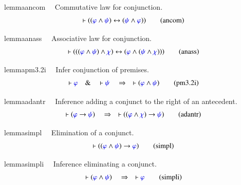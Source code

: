 \begin{restatable}{lemma}{ancom}~~ Commutative law for conjunction.  
\begin{align}
\vdash ( ( \mw{\varphi} \wedge \mw{\psi} ) \leftrightarrow ( \mw{\psi} \wedge
    \mw{\varphi} ) )\label{eq:ancom}\tag{ancom}
\end{align}
\end{restatable}

\begin{restatable}{lemma}{anass}~~ Associative law for conjunction.  
\begin{align}
\vdash ( ( ( \mw{\varphi} \wedge \mw{\psi} ) \wedge \mw{\chi} ) \leftrightarrow
    ( \mw{\varphi} \wedge ( \mw{\psi} \wedge \mw{\chi} ) )
    )\label{eq:anass}\tag{anass}
\end{align}
\end{restatable}

\begin{restatable}{lemma}{pm3.2i}~~ Infer conjunction of premises.  
\begin{align}
\vdash \mw{\varphi}\quad\&\quad \vdash \mw{\psi}\quad\Rightarrow\quad \vdash (
    \mw{\varphi} \wedge \mw{\psi} )\label{eq:pm3.2i}\tag{pm3.2i}
\end{align}
\end{restatable}

\begin{restatable}{lemma}{adantr}~~ Inference adding a conjunct to the right of
an antecedent.  
\begin{align}
\vdash ( \mw{\varphi} \rightarrow \mw{\psi} )\quad\Rightarrow\quad \vdash ( (
    \mw{\varphi} \wedge \mw{\chi} ) \rightarrow \mw{\psi}
    )\label{eq:adantr}\tag{adantr}
\end{align}
\end{restatable}

\begin{restatable}{lemma}{simpl}~~ Elimination of a conjunct.  
\begin{align}
\vdash ( ( \mw{\varphi} \wedge \mw{\psi} ) \rightarrow \mw{\varphi}
    )\label{eq:simpl}\tag{simpl}
\end{align}
\end{restatable}

\begin{restatable}{lemma}{simpli}~~ Inference eliminating a conjunct. 
~
\begin{align}
\vdash ( \mw{\varphi} \wedge \mw{\psi} )\quad\Rightarrow\quad \vdash
    \mw{\varphi}\label{eq:simpli}\tag{simpli}
\end{align}
\end{restatable}

